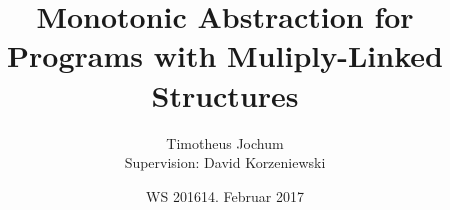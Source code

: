\documentclass {beamer}
\title{Monotonic Abstraction for Programs with Muliply-Linked Structures}
\date{WS 2016}
\author{Timotheus Jochum \\ Supervision: David Korzeniewski}
\institute [RWTH-Aachen] {Rheinisch-Westfaelische Technische Hochschule Aachen - Bc. Informatik}
\date{14. Februar 2017}
\begin{document}
\begin{frame}[fragile]{}
        \titlepage
\end{frame}











\begin{frame}[fragile]{}
      
    
\end{frame}
\end{document}
